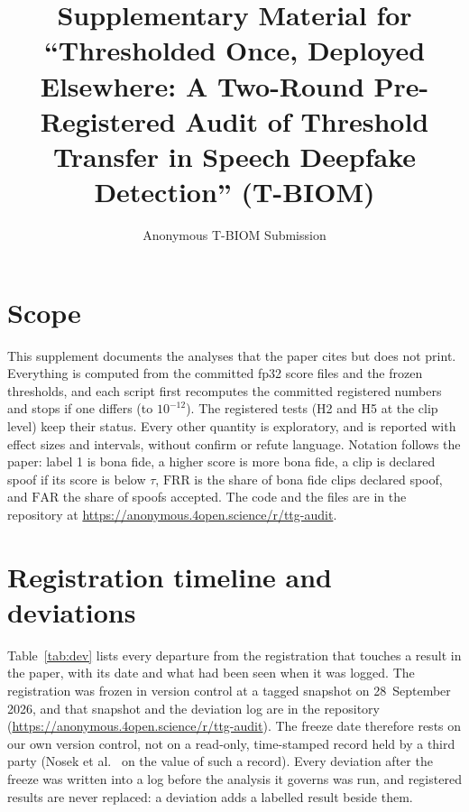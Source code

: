 \documentclass[10pt]{article}
\title{Supplementary Material for\\ ``Thresholded Once, Deployed Elsewhere: A Two-Round Pre-Registered Audit of Threshold Transfer in Speech
Deepfake Detection'' (T-BIOM)}
\author{Anonymous T-BIOM Submission}
\date{}
\newcommand{\repo}{\url{https://anonymous.4open.science/r/ttg-audit}}
\newcommand{\frr}{\mathrm{FRR}}
\newcommand{\far}{\mathrm{FAR}}
\begin{document}
\maketitle

\section{Scope}
This supplement documents the analyses that the paper cites but does not print. Everything is computed from the committed fp32 score
files and the frozen thresholds, and each script first recomputes the committed registered numbers and stops if one differs (to
\(10^{-12}\)). The registered tests (H2 and H5 at the clip level) keep their status. Every other quantity is exploratory, and is reported
with effect sizes and intervals, without confirm or refute language. Notation follows the paper: label 1 is bona fide, a higher score is
more bona fide, a clip is declared spoof if its score is below \(\tau\), \(\frr\) is the share of bona fide clips declared spoof, and
\(\far\) the share of spoofs accepted. The code and the files are in the repository at \repo.

\section{Registration timeline and deviations}
Table~\ref{tab:dev} lists every departure from the registration that touches a result in the paper, with its date and what had been seen
when it was logged. The registration was frozen in version control at a tagged snapshot on 28~September 2026, and that snapshot and the deviation log are in the repository (\repo). The freeze date therefore rests on our own version control, not on a read-only, time-stamped record held by a third party (Nosek et al.\ \cite{nosek18_prereg} on the value of such a record). Every
deviation after the freeze was written into a log before the analysis it governs was run, and registered results are never replaced: a
deviation adds a labelled result beside them.
\end{document}
